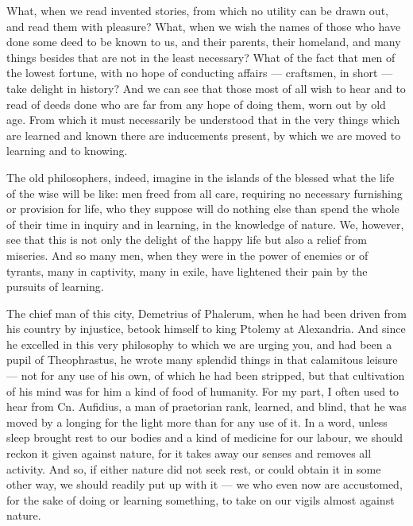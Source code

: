  What, when we read invented stories, from which no utility can be drawn out, and read them with pleasure? What, when we wish the names of those who have done some deed to be known to us, and their parents, their homeland, and many things besides that are not in the least necessary? What of the fact that men of the lowest fortune, with no hope of conducting affairs — craftsmen, in short — take delight in history? And we can see that those most of all wish to hear and to read of deeds done who are far from any hope of doing them, worn out by old age. From which it must necessarily be understood that in the very things which are learned and known there are inducements present, by which we are moved to learning and to knowing.

 The old philosophers, indeed, imagine in the islands of the blessed what the life of the wise will be like: men freed from all care, requiring no necessary furnishing or provision for life, who they suppose will do nothing else than spend the whole of their time in inquiry and in learning, in the knowledge of nature. We, however, see that this is not only the delight of the happy life but also a relief from miseries. And so many men, when they were in the power of enemies or of tyrants, many in captivity, many in exile, have lightened their pain by the pursuits of learning.

 The chief man of this city, Demetrius of Phalerum, when he had been driven from his country by injustice, betook himself to king Ptolemy at Alexandria. And since he excelled in this very philosophy to which we are urging you, and had been a pupil of Theophrastus, he wrote many splendid things in that calamitous leisure — not for any use of his own, of which he had been stripped, but that cultivation of his mind was for him a kind of food of humanity. For my part, I often used to hear from Cn. Aufidius, a man of praetorian rank, learned, and blind, that he was moved by a longing for the light more than for any use of it. In a word, unless sleep brought rest to our bodies and a kind of medicine for our labour, we should reckon it given against nature, for it takes away our senses and removes all activity. And so, if either nature did not seek rest, or could obtain it in some other way, we should readily put up with it — we who even now are accustomed, for the sake of doing or learning something, to take on our vigils almost against nature.

